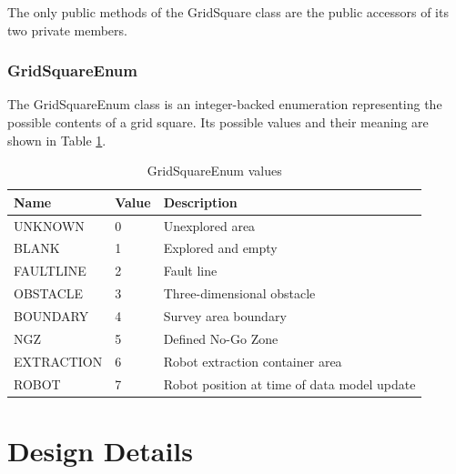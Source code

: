 \documentclass[12pt]{article}
\begin{document}
The only public methods of the GridSquare class are the public accessors of its two private members.

\subsubsection{GridSquareEnum}
The GridSquareEnum class is an integer-backed enumeration representing the possible contents of a grid square. Its possible values and their meaning are shown in Table \ref{table:gridsquareenum}.

\begin{table}[h!]
\begin{tabular}{ | p{} | p{} |p{}|}
\hline
\textbf{Name} & \textbf{Value} & \textbf{Description} \\
\hline
UNKNOWN & 0 & Unexplored area \\
\hline
BLANK & 1 & Explored and empty \\
\hline
FAULTLINE & 2 & Fault line \\
\hline
OBSTACLE & 3 & Three-dimensional obstacle \\
\hline
BOUNDARY & 4 & Survey area boundary \\
\hline
NGZ & 5 & Defined No-Go Zone \\
\hline
EXTRACTION & 6 & Robot extraction container area \\
\hline
ROBOT & 7 & Robot position at time of data model update \\
\hline
\end{tabular}
\caption{GridSquareEnum values}
\label{table:gridsquareenum}
\end{table}

\FloatBarrier
\section{Design Details}
\end{document}
